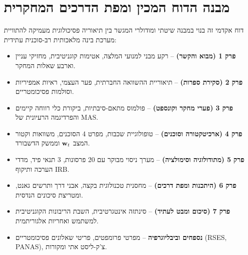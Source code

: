 \section{מבנה הדוח המכין ומפת הדרכים המחקרית}
\label{sec:intro_outline}
דוח אקדמי זה בנוי במבנה שיטתי ומודולרי המגשר בין תיאוריה פסיכולוגית מעמיקה להתוויית מערכת בינה מלאכותית רב-סוכנית עתידית:

\begin{itemize}
    \setlength{\itemsep}{1pt}
    \setlength{\parskip}{0pt}
    \item \textbf{פרק 1 (מבוא והקשר)} -- רקע מבני למנועי המלצה, אטימות קוגניטיבית, מחזיקי עניין וארבע שאלות המחקר.
    \item \textbf{פרק 2 (סקירת ספרות)} -- תיאוריית ההשוואה החברתית, פער העצמי, ראיות אמפיריות וסולמות פסיכומטריים.
    \item \textbf{פרק 3 (פערי מחקר וקונספט)} -- פולמוס מתאם-סיבתיות, ביקורת כלי רווחה קיימים והפרדיגמה הרעיונית של MAS.
    \item \textbf{פרק 4 (ארכיטקטורה וסוכנים)} -- טופולוגיית שכבות, מפרט 4 הסוכנים, משוואות וקטור המצב $\mathbf{w}_t{}$ וממשק הדשבורד.
    \item \textbf{פרק 5 (מתודולוגיה וסימולציה)} -- מערך ניסוי מבוקר עם 20 פרסונות, 3 תנאי פיד, מדדי הערכה ותיקוף IRB.
    \item \textbf{פרק 6 (היתכנות ומפת דרכים)} -- מחסנית טכנולוגית בקצה, אבני דרך ותרשים גאנט, ומטריצת סיכונים הנדסית.
    \item \textbf{פרק 7 (סיכום ומבט לעתיד)} -- סינתזה אינטגרטיבית, השבת הריבונות הקוגניטיבית למשתמש ואחריות אלגוריתמית.
    \item \textbf{נספחים וביבליוגרפיה} -- מפרטי פרומפטים, פריטי שאלונים פסיכומטריים (\textenglish{RSES, PANAS}), צ'ק-ליסט אתי ומקורות.
\end{itemize}
